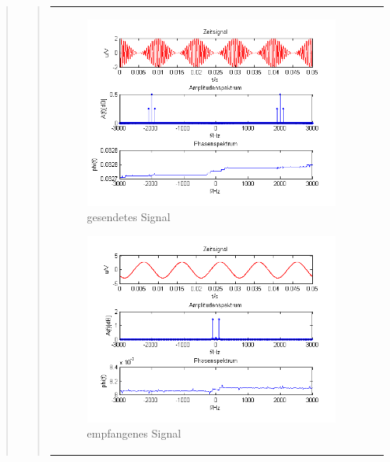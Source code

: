\begin{quote}
\begin{quote}
\begin{center}
\begin{tabular}{ll}
\begin{minipage}{0.67\textwidth}
                \begin{figure}[H]
                    \label{fig:DemocosinusmT}
                    \includegraphics[scale=0.7]{Bilder/Am_Cos_2k_100Hz_mo}
                    \caption{gesendetes Signal}
                \end{figure}
        
            \end{minipage}
        
            \begin{minipage}{0.67\textwidth}
                \begin{figure}[H]
                    \label{fig:DemocosinusmT2}
                    \includegraphics[scale=0.7]{Bilder/Demo_Sin_2k_100Hz_mo_mitTiefpass}
                    \caption{empfangenes Signal}
                \end{figure}
        

\end{minipage}
\end{tabular}
\end{center}
\end{quote}
\end{quote}
